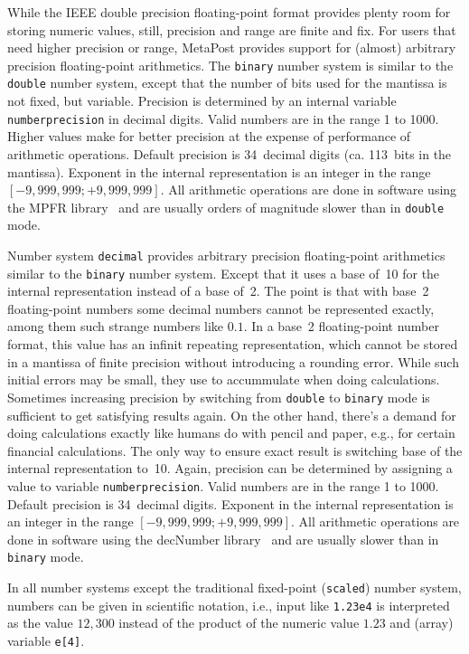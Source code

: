 While the IEEE double precision floating-point format provides plenty
room for storing numeric values, still, precision and range are finite
and fix.  For users that need higher precision or range, MetaPost
provides support for (almost) arbitrary precision floating-point
arithmetics.  The \texttt{binary} number
system is similar to the \texttt{double} number system, except that the
number of bits used for the mantissa is not fixed, but variable.
Precision is determined by an internal variable
\texttt{numberprecision}\label{Dnumberprecision}
in decimal digits.  Valid numbers are in the range 1 to 1000.  Higher
values make for better precision at the expense of performance of
arithmetic operations.  Default precision is 34~decimal digits
(ca. 113~bits in the mantissa).  Exponent in the internal representation
is an integer in the range $[-9,999,999; +9,999,999]$.  All arithmetic
operations are done in software using the MPFR library~\cite{lib:mpfr}
and are usually orders of magnitude slower than in \texttt{double} mode.

Number system \texttt{decimal} provides
arbitrary precision floating-point arithmetics similar to the
\texttt{binary} number system.  Except that it uses a base of~10 for the
internal representation instead of a base of~2.  The point is that with
base~2 floating-point numbers some decimal numbers cannot be represented
exactly, among them such strange numbers like $0.1$.  In a base~2
floating-point number format, this value has an infinit repeating
representation, which cannot be stored in a mantissa of finite precision
without introducing a rounding error.  While such initial errors may be
small, they use to accummulate when doing calculations.  Sometimes
increasing precision by switching from \texttt{double} to
\texttt{binary} mode is sufficient to get satisfying results again.  On
the other hand, there's a demand for doing calculations exactly like
humans do with pencil and paper, e.g., for certain financial
calculations.  The only way to ensure exact result is switching base of
the internal representation to~10.  Again, precision can be determined
by assigning a value to variable
\texttt{numberprecision}.
Valid numbers are in the range 1 to 1000.  Default precision is
34~decimal digits.  Exponent in the internal representation is an
integer in the range $[-9,999,999; +9,999,999]$.  All arithmetic
operations are done in software using the decNumber
library~\cite{lib:decnumber} and are usually slower than in
\texttt{binary} mode.

In all number systems except the traditional fixed-point
(\texttt{scaled}) number system, numbers can be given in scientific
notation, i.e., input like \texttt{1.23e4} is interpreted as the value
$12,300$ instead of the product of the numeric value $1.23$ and (array)
variable \verb|e[4]|.



